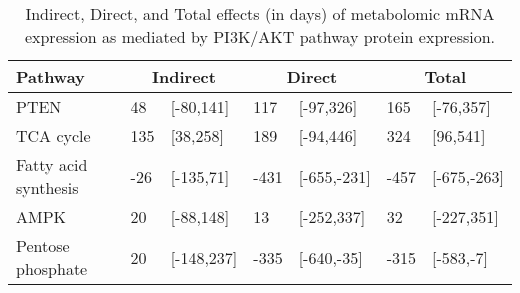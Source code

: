 \begin{table}[ht]
\centering
\begin{tabular}{lllllll}
  \hline
  Pathway & \multicolumn{2}{c}{Indirect} & \multicolumn{2}{c}{Direct}  & \multicolumn{2}{c}{Total} \\
 \hline
PTEN & 48 & [-80,141] & 117 & [-97,326] & 165 & [-76,357] \\ 
  TCA cycle & 135 & [38,258] & 189 & [-94,446] & 324 & [96,541] \\ 
  Fatty acid synthesis & -26 & [-135,71] & -431 & [-655,-231] & -457 & [-675,-263] \\ 
  AMPK & 20 & [-88,148] & 13 & [-252,337] & 32 & [-227,351] \\ 
  Pentose phosphate & 20 & [-148,237] & -335 & [-640,-35] & -315 & [-583,-7] \\ 
   \hline
\end{tabular}
\caption{Indirect, Direct, and Total effects (in days) of metabolomic mRNA expression as mediated by PI3K/AKT pathway protein expression.} 
\end{table}
